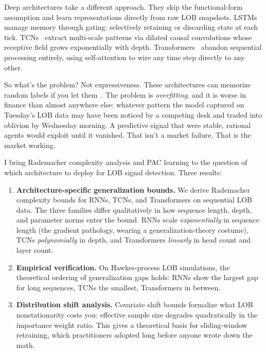\documentclass[11pt]{article}
\theoremstyle{definition}
\theoremstyle{remark}
\begin{document}
Deep architectures take a different approach.
They skip the functional-form assumption and learn representations directly from raw LOB snapshots.
LSTMs~\citep{hochreiter1997long} manage memory through gating: selectively retaining or discarding state at each tick.
TCNs~\citep{bai2018empirical} extract multi-scale patterns via dilated causal convolutions whose receptive field grows exponentially with depth.
Transformers~\citep{vaswani2017attention} abandon sequential processing entirely, using self-attention to wire any time step directly to any other.

So what's the problem?
Not expressiveness.
These architectures can memorize random labels if you let them~\citep{zhang2017understanding}.
The problem is \emph{overfitting}, and it is worse in finance than almost anywhere else: whatever pattern the model captured on Tuesday's LOB data may have been noticed by a competing desk and traded into oblivion by Wednesday morning.
A predictive signal that were stable, rational agents would exploit until it vanished.
That isn't a market failure.
That is the market working.

I bring Rademacher complexity analysis and PAC learning to the question of which architecture to deploy for LOB signal detection.
Three results:

\begin{enumerate}
    \item \textbf{Architecture-specific generalization bounds.}
    We derive Rademacher complexity bounds for RNNs, TCNs, and Transformers on sequential LOB data.
    The three families differ qualitatively in how sequence length, depth, and parameter norms enter the bound.
    RNNs scale \emph{exponentially} in sequence length (the gradient pathology, wearing a generalization-theory costume), TCNs \emph{polynomially} in depth, and Transformers \emph{linearly} in head count and layer count.

    \item \textbf{Empirical verification.}
    On Hawkes-process LOB simulations, the theoretical ordering of generalization gaps holds: RNNs show the largest gap for long sequences, TCNs the smallest, Transformers in between.

    \item \textbf{Distribution shift analysis.}
    Covariate shift bounds formalize what LOB nonstationarity costs you: effective sample size degrades quadratically in the importance weight ratio.
    This gives a theoretical basis for sliding-window retraining, which practitioners adopted long before anyone wrote down the math.
\end{enumerate}
\end{document}
